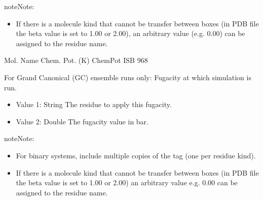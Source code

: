 \documentclass[letterpaper,10pt,english]{sphinxmanual}
\begin{document}
\begin{description}
\begin{sphinxadmonition}{note}{Note:}
\begin{itemize}
\item {} 
\sphinxAtStartPar
If there is a molecule kind that cannot be transfer between boxes (in PDB file the beta value is set to 1.00 or 2.00), an arbitrary value (e.g. 0.00) can be assigned to the residue name.

\end{itemize}
\end{sphinxadmonition}

\begin{sphinxVerbatim}[commandchars=\\\{\}]
\PYGZsh{}\PYGZsh{}\PYGZsh{}\PYGZsh{}\PYGZsh{}\PYGZsh{}\PYGZsh{}\PYGZsh{}\PYGZsh{}\PYGZsh{}\PYGZsh{}\PYGZsh{}\PYGZsh{}\PYGZsh{}\PYGZsh{}\PYGZsh{}\PYGZsh{}\PYGZsh{}\PYGZsh{}\PYGZsh{}\PYGZsh{}\PYGZsh{}\PYGZsh{}\PYGZsh{}\PYGZsh{}\PYGZsh{}\PYGZsh{}\PYGZsh{}\PYGZsh{}\PYGZsh{}\PYGZsh{}\PYGZsh{}\PYGZsh{}
\PYGZsh{} Mol.  Name Chem.  Pot.  (K)
\PYGZsh{}\PYGZsh{}\PYGZsh{}\PYGZsh{}\PYGZsh{}\PYGZsh{}\PYGZsh{}\PYGZsh{}\PYGZsh{}\PYGZsh{}\PYGZsh{}\PYGZsh{}\PYGZsh{}\PYGZsh{}\PYGZsh{}\PYGZsh{}\PYGZsh{}\PYGZsh{}\PYGZsh{}\PYGZsh{}\PYGZsh{}\PYGZsh{}\PYGZsh{}\PYGZsh{}\PYGZsh{}\PYGZsh{}\PYGZsh{}\PYGZsh{}\PYGZsh{}\PYGZsh{}\PYGZsh{}\PYGZsh{}\PYGZsh{}
ChemPot   ISB     \PYGZhy{}968
\end{sphinxVerbatim}

\item[{\sphinxcode{\sphinxupquote{Fugacity}}}] \leavevmode
\sphinxAtStartPar
For Grand Canonical (GC) ensemble runs only: Fugacity at which simulation is run.
\begin{itemize}
\item {} 
\sphinxAtStartPar
Value 1: String \sphinxhyphen{} The residue to apply this fugacity.

\item {} 
\sphinxAtStartPar
Value 2: Double \sphinxhyphen{} The fugacity value in bar.

\end{itemize}

\begin{sphinxadmonition}{note}{Note:}\begin{itemize}
\item {} 
\sphinxAtStartPar
For binary systems, include multiple copies of the tag (one per residue kind).

\item {} 
\sphinxAtStartPar
If there is a molecule kind that cannot be transfer between boxes (in PDB file the beta value is set to 1.00 or 2.00) an arbitrary value e.g. 0.00 can be assigned to the residue name.


\end{itemize}
\end{sphinxadmonition}
\end{description}
\end{document}
